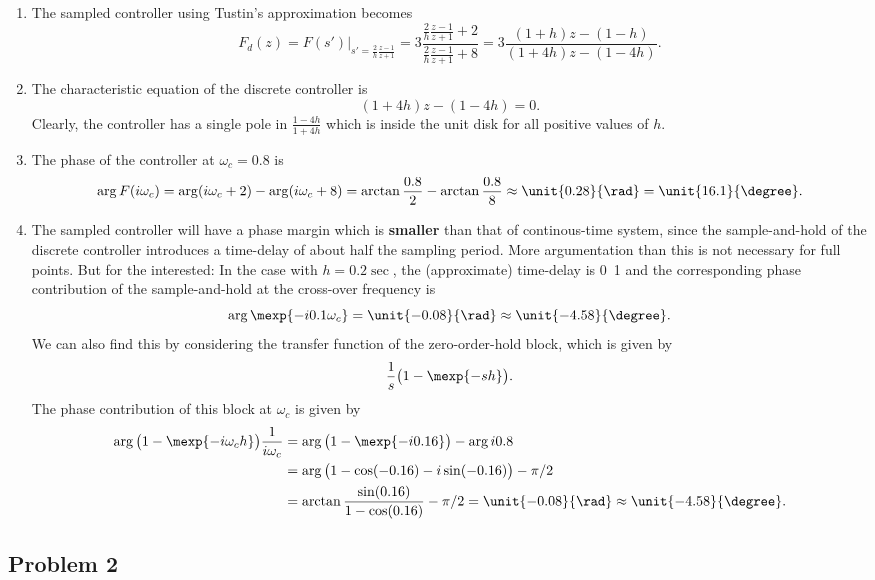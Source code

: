 \documentclass{scrartcl}
\newcommand{\tustin}{\ensuremath{\frac{2}{h}\frac{z-1}{z+1}}}
\begin{document}
\begin{enumerate}
\item The sampled controller using Tustin's approximation becomes
      \[F_d(z) = F(s')|_{s'=\tustin} = 3 \frac{\tustin + 2}{\tustin + 8} = 3 \frac{(1+h)z-(1-h)}{(1+4h)z-(1-4h)}. \]
\item The characteristic equation of the discrete controller is
      \[ (1+4h)z-(1-4h) = 0. \]
      Clearly, the controller has a single pole in $\frac{1-4h}{1+4h}$ which is inside the unit disk for all positive values of $h$.
\item The phase of the controller at $\omega_c = 0.8$ is 
      \[\arg F(i\omega_c) = \arg (i\omega_c + 2) - \arg (i\omega_c + 8) = \arctan \frac{0.8}{2} - \arctan \frac{0.8}{8} \approx \unit{0.28}{\rad} = \unit{16.1}{\degree}. \]
\item The sampled controller will have a phase margin which is \textbf{smaller} than that of continous-time system,  since the sample-and-hold of the discrete controller introduces a time-delay of about half the sampling period. More argumentation than this is not necessary for full points. But for the interested: In the case with $h=\unit{0.2}{\sec}$, the (approximate) time-delay is \unit{0.1}{\sec} and the corresponding phase contribution of the sample-and-hold at the cross-over frequency is
      \[ \arg \mexp{-i0.1\omega_c} = \unit{-0.08}{\rad} \approx \unit{-4.58}{\degree}. \]
      We can also find this by considering the transfer function of the zero-order-hold block, which is given by
      \[ \frac{1}{s}\big(1-\mexp{-sh}\big). \]
      The phase contribution of this block at $\omega_c$ is given by
      \begin{equation*}
      \begin{split}
       \arg \big(1-\mexp{-i\omega_ch}\big)\frac{1}{i\omega_c} &= \arg \big(1-\mexp{-i0.16}\big) - \arg i0.8\\
      &= \arg \big(1-\cos(-0.16) -i\sin(-0.16)\big) - \pi/2\\ &= \arctan \frac{\sin(0.16)}{1-\cos(0.16)} - \pi/2 = \unit{-0.08}{\rad} \approx \unit{-4.58}{\degree}.
      \end{split}
      \end{equation*}
\end{enumerate}
\subsection*{Problem 2}
\label{sec-3-2}
\end{document}
